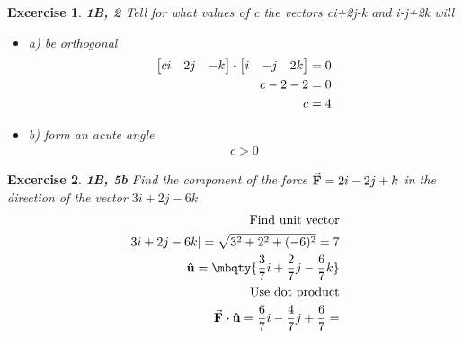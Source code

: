 \documentclass[11pt]{article}
\newtheorem{excercise}{Excercise}
\begin{document}
    \begin{excercise}
        \textbf{1B, 2}
        Tell for what values of c the vectors ci+2j-k and i-j+2k will
        \begin{itemize}
            \item a) be orthogonal
            \begin{align}
                \bmqty{ci & 2j & -k}\vdot\bmqty{i & -j & 2k}=0\\
                c-2-2=0\\
                c=4
            \end{align}
            \item b) form an acute angle
            \begin{align}
                c>0
            \end{align}
        \end{itemize}
    \end{excercise}

    \begin{excercise}
        \textbf{1B, 5b}
        Find the component of the force $\va{F}=2i-2j+k$ in the direction of the vector $3i+2j-6k$
        \begin{align}
            \text{Find unit vector} & \\
            \abs{3i+2j-6k}=\sqrt{3^2 + 2^2 + (-6)^2}=7\\
            \vu{u}=\mbqty{\frac{3}{7}i + \frac{2}{7}j - \frac{6}{7}k}\\
            \text{Use dot product}\\
            \va{F}\vdot\vu{u}=\frac{6}{7}i - \frac{4}{7}j + \frac{6}{7}=
        \end{align}
    \end{excercise}
\end{document}
